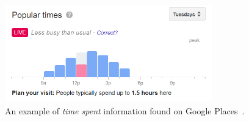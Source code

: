 	\begin{figure}[!ht]
		\centering
		\includegraphics[width=0.8\textwidth]{graphics/google_visit_duration.png}
		\caption{An example of \textit{time spent} information found on Google Places~\protect\cite{google_business}.}
		\label{fig:visit_duration}
	\end{figure}
	
